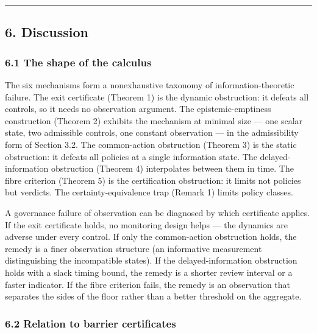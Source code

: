 \documentclass[11pt]{article}
\begin{document}
\begin{center}\rule{0.5\linewidth}{0.5pt}\end{center}

\subsection{6. Discussion}\label{discussion}

\subsubsection{6.1 The shape of the
calculus}\label{the-shape-of-the-calculus}

The six mechanisms form a nonexhaustive taxonomy of
information-theoretic failure. The exit certificate (Theorem 1) is the
dynamic obstruction: it defeats all controls, so it needs no observation
argument. The epistemic-emptiness construction (Theorem 2) exhibits the
mechanism at minimal size --- one scalar state, two admissible controls,
one constant observation --- in the admissibility form of Section 3.2. The common-action obstruction (Theorem 3) is the static
obstruction: it defeats all policies at a single information state. The
delayed-information obstruction (Theorem 4) interpolates between them in
time. The fibre criterion (Theorem 5) is the certification obstruction:
it limits not policies but verdicts. The certainty-equivalence trap
(Remark 1) limits policy classes.

A governance failure of observation can be diagnosed by which
certificate applies. If the exit certificate holds, no monitoring design
helps --- the dynamics are adverse under every control. If only the
common-action obstruction holds, the remedy is a finer observation
structure (an informative measurement distinguishing the incompatible
states). If the delayed-information obstruction holds with a slack
timing bound, the remedy is a shorter review interval or a faster
indicator. If the fibre criterion fails, the remedy is an observation
that separates the sides of the floor rather than a better threshold on
the aggregate.

\subsubsection{6.2 Relation to barrier
certificates}\label{relation-to-barrier-certificates}
\end{document}
